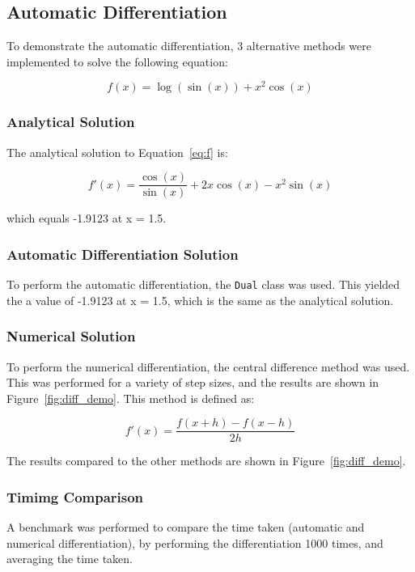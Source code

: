 \subsection{Automatic Differentiation}
To demonstrate the automatic differentiation, 3 alternative methods were implemented to solve the following equation: 

\begin{equation}
    f(x) = \log(\sin(x)) + x^2 \cos(x)
    \label{eq:f}
\end{equation}

\subsubsection{Analytical Solution}
The analytical solution to Equation~\ref{eq:f} is: 

\begin{equation}
    f'(x) = \frac{\cos(x)}{\sin(x)} + 2x \cos(x) - x^2 \sin(x)
    \label{eq:f_prime}
\end{equation}

which equals -1.9123 at x = 1.5.

\subsubsection{Automatic Differentiation Solution}
To perform the automatic differentiation, the \texttt{Dual} class was used.
This yielded the a value of -1.9123 at x = 1.5, which is the same as the analytical solution.


\subsubsection{Numerical Solution}
To perform the numerical differentiation, the central difference method was used.
This was performed for a variety of step sizes, and the results are shown in Figure~\ref{fig:diff_demo}.
This method is defined as: 

\begin{equation}
    f'(x) = \frac{f(x+h) - f(x-h)}{2h}
    \label{eq:central_diff}
\end{equation}

The results compared to the other methods are shown in Figure~\ref{fig:diff_demo}.

\subsubsection{Timimg Comparison}
A benchmark was performed to compare the time taken (automatic and numerical differentiation), by performing the differentiation 1000 times, 
and averaging the time taken.


